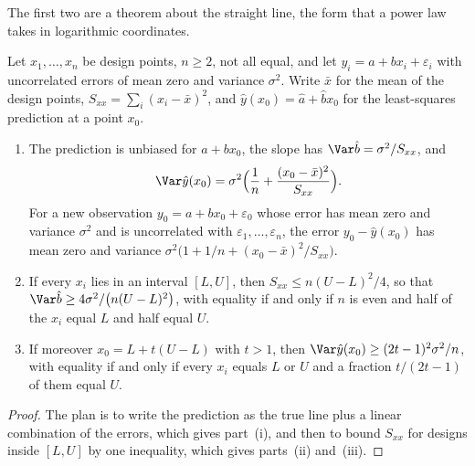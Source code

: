 \begin{refsection}
The first two are a theorem about the straight line, the form that a power law takes in logarithmic coordinates.

\begin{theorem}\label{thm:extrapolation:variance}
Let $x_1,\dots,x_n$ be design points, $n\ge2$, not all equal, and let $y_i=a+bx_i+\varepsilon_i$ with uncorrelated errors of mean zero and variance $\sigma^2$. Write $\bar x$ for the mean of the design points, $S_{xx}=\sum_i(x_i-\bar x)^2$, and $\hat y(x_0)=\hat a+\hat bx_0$ for the least-squares prediction at a point $x_0$.
\begin{enumerate}
\item The prediction is unbiased for $a+bx_0$, the slope has $\Var\hat b=\sigma^2/S_{xx}$, and
\begin{equation}\label{eq:extrapolation:var}
\Var\hat y(x_0)=\sigma^2\Bigl(\frac1n+\frac{(x_0-\bar x)^2}{S_{xx}}\Bigr).
\end{equation}
For a new observation $y_0=a+bx_0+\varepsilon_0$ whose error has mean zero and variance $\sigma^2$ and is uncorrelated with $\varepsilon_1,\dots,\varepsilon_n$, the error $y_0-\hat y(x_0)$ has mean zero and variance $\sigma^2\bigl(1+1/n+(x_0-\bar x)^2/S_{xx}\bigr)$.
\item If every $x_i$ lies in an interval $[L,U]$, then $S_{xx}\le n(U-L)^2/4$, so that $\Var\hat b\ge4\sigma^2/\bigl(n(U-L)^2\bigr)$, with equality if and only if $n$ is even and half of the $x_i$ equal $L$ and half equal $U$.
\item If moreover $x_0=L+t(U-L)$ with $t>1$, then $\Var\hat y(x_0)\ge(2t-1)^2\sigma^2/n$, with equality if and only if every $x_i$ equals $L$ or $U$ and a fraction $t/(2t-1)$ of them equal $U$.
\end{enumerate}
\end{theorem}

\begin{proof}
The plan is to write the prediction as the true line plus a linear combination of the errors, which gives part~(i), and then to bound $S_{xx}$ for designs inside $[L,U]$ by one inequality, which gives parts~(ii) and~(iii).


\end{proof}
\end{refsection}
